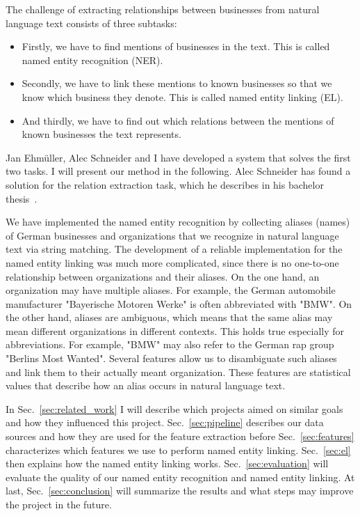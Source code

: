 The challenge of extracting relationships between businesses from natural language text consists of three subtasks:
\begin{itemize}
\item Firstly, we have to find mentions of businesses in the text. This is called named entity recognition (NER).
\item Secondly, we have to link these mentions to known businesses so that we know which business they denote. This is called named entity linking (EL).
\item And thirdly, we have to find out which relations between the mentions of known businesses the text represents.
\end{itemize}
Jan Ehmüller, Alec Schneider and I have developed a system that solves the first two tasks. I will present our method in the following. Alec Schneider has found a solution for the relation extraction task, which he describes in his bachelor thesis~\cite{Alec}.

We have implemented the named entity recognition by collecting aliases (names) of German businesses and organizations that we recognize in natural language text via string matching. The development of a reliable implementation for the named entity linking was much more complicated, since there is no one-to-one relationship between organizations and their aliases. On the one hand, an organization may have multiple aliases. For example, the German automobile manufacturer "Bayerische Motoren Werke" is often abbreviated with "BMW". On the other hand, aliases are ambiguous, which means that the same alias may mean different organizations in different contexts. This holds true especially for abbreviations. For example, "BMW" may also refer to the German rap group "Berlins Most Wanted".
Several features allow us to disambiguate such aliases and link them to their actually meant organization. These features are statistical values that describe how an alias occurs in natural language text.

In Sec.~\ref{sec:related_work} I will describe which projects aimed on similar goals and how they influenced this project. Sec.~\ref{sec:pipeline} describes our data sources and how they are used for the feature extraction before Sec.~\ref{sec:features} characterizes which features we use to perform named entity linking. Sec.~\ref{sec:el} then explains how the named entity linking works. Sec.~\ref{sec:evaluation} will evaluate the quality of our named entity recognition and named entity linking. At last, Sec.~\ref{sec:conclusion} will summarize the results and what steps may improve the project in the future.
\fi

